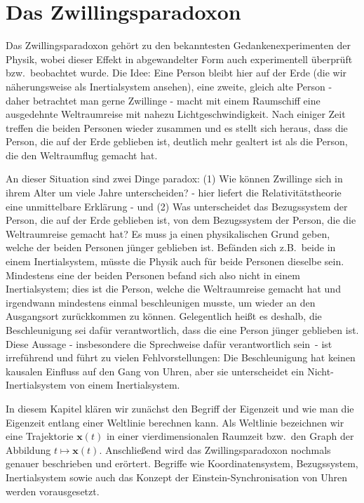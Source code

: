 

\chapter{Das Zwillingsparadoxon}
\label{chap_Zwilling}

Das Zwillingsparadoxon geh\"ort zu den bekanntesten Gedankenexperimenten der Physik,
wobei dieser Effekt in abgewandelter Form auch
experimentell \"uberpr\"uft bzw.\ beobachtet wurde. 
Die Idee: Eine Person bleibt hier auf der Erde (die wir n\"aherungsweise als Inertialsystem
ansehen), eine zweite, gleich alte Person - daher betrachtet man gerne Zwillinge - macht
mit einem Raumschiff eine ausgedehnte Weltraumreise mit nahezu Lichtgeschwindigkeit.
Nach einiger Zeit treffen die beiden Personen wieder zusammen und es stellt sich heraus,
dass die Person, die auf der Erde geblieben ist, deutlich mehr gealtert ist als die Person, die den
Weltraumflug gemacht hat. 

An dieser Situation sind zwei Dinge paradox: (1) Wie k\"onnen Zwillinge sich in ihrem
Alter um viele Jahre unterscheiden? - hier liefert die Relativit\"atstheorie eine unmittelbare
Erkl\"arung - und (2) Was unterscheidet das Bezugssystem der Person, die auf der Erde
geblieben ist, von dem Bezugssystem der Person, die die Weltraumreise gemacht hat?
Es muss ja einen physikalischen Grund geben, welche der beiden Personen j\"unger
geblieben ist. Bef\"anden sich z.B.\ beide in einem Inertial\-sys\-tem, m\"usste die Physik auch f\"ur
beide Personen dieselbe sein. Mindestens eine der beiden Personen befand sich also nicht in einem 
Inertialsystem; dies ist die Person, welche die Weltraumreise gemacht hat und irgendwann
mindestens einmal beschleunigen musste, um wieder an den Ausgangsort zur\"uckkommen zu k\"onnen. 
Gelegentlich hei\ss t es deshalb, die Beschleunigung sei daf\"ur verantwortlich, dass die
eine Person j\"unger geblieben ist. Diese Aussage - insbesondere die Sprechweise
\glqq daf\"ur verantwortlich sein\grqq\ - ist irref\"uhrend und f\"uhrt zu vielen
Fehlvorstellungen: Die Beschleunigung hat keinen kausalen Einfluss auf den Gang von
Uhren, aber sie unterscheidet ein Nicht-Inertialsystem von einem Inertialsystem.  

In diesem Kapitel kl\"aren wir zun\"achst den Begriff der Eigenzeit und wie man die
Eigenzeit entlang einer Weltlinie berechnen kann. 
Als Weltlinie bezeichnen wir eine 
Trajektorie $\pmb{x}(t)$ in einer vierdimensionalen Raumzeit
bzw.\ den Graph der Abbildung $t \mapsto \pmb{x}(t)$.  
Anschlie\ss end wird das Zwillingsparadoxon
nochmals genauer beschrieben und er\"ortert. Begriffe wie Koordinatensystem, Bezugssystem,
Inertialsystem sowie auch das Konzept der Einstein-Synchronisation von Uhren werden vorausgesetzt. 
 
